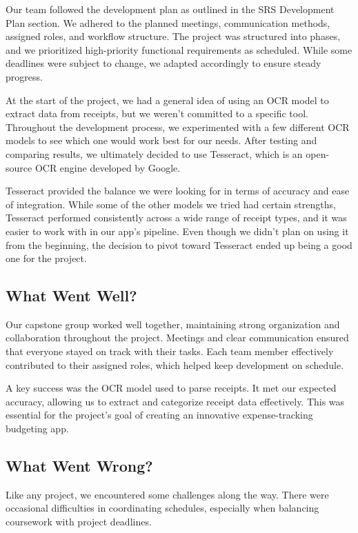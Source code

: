 \documentclass{article}
\begin{document}
Our team followed the development plan as outlined in the SRS Development Plan section.
We adhered to the planned meetings, communication methods, assigned roles, and workflow structure. 
The project was structured into phases, and we prioritized high-priority functional requirements as scheduled. 
While some deadlines were subject to change, we adapted accordingly to ensure steady progress.

At the start of the project, we had a general idea of using an OCR model to extract data from receipts, but we weren’t committed to a specific tool. 
Throughout the development process, we experimented with a few different OCR models to see which one would work best for our needs.
After testing and comparing results, we ultimately decided to use Tesseract, which is an open-source OCR engine developed by Google.

Tesseract provided the balance we were looking for in terms of accuracy and ease of integration. While some of the other models we tried had certain strengths, 
Tesseract performed consistently across a wide range of receipt types, and it was easier to work with in our app’s pipeline.
Even though we didn’t plan on using it from the beginning, the decision to pivot toward Tesseract ended up being a good one for the project.


\subsection{What Went Well?}

Our capstone group worked well together, maintaining strong organization and collaboration throughout the project.
Meetings and clear communication ensured that everyone stayed on track with their tasks.
Each team member effectively contributed to their assigned roles, which helped keep development on schedule.

A key success was the OCR model used to parse receipts. It met our expected accuracy, allowing us to extract and categorize receipt data effectively.
This was essential for the project's goal of creating an innovative expense-tracking budgeting app.

\subsection{What Went Wrong?}

Like any project, we encountered some challenges along the way. There were occasional difficulties in coordinating 
schedules, especially when balancing coursework with project deadlines. 
\end{document}

